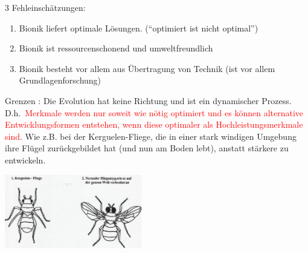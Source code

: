3 Fehleinschätzungen:
\begin{enumerate}
	\item Bionik liefert optimale Lösungen. (``optimiert ist nicht optimal'')
	\item Bionik ist ressourcenschonend und umweltfreundlich
	\item Bionik besteht vor allem aus Übertragung von Technik (ist vor allem Grundlagenforschung)
\end{enumerate}
Grenzen \dangersign: Die Evolution hat keine Richtung und ist ein dynamischer Prozess. D.h.\ \textcolor{red}{Merkmale werden nur soweit wie nötig optimiert und es können alternative Entwicklungsformen entstehen, wenn diese optimaler als Hochleistungsmerkmale sind}. Wie z.B. bei der Kerguelen-Fliege, die in einer stark windigen Umgebung ihre Flügel zurückgebildet hat (und nun am Boden lebt), anstatt stärkere zu entwickeln. 
\begin{center}
	\includegraphics[width=6cm]{lec1/figures/fliege.png}
\end{center}

